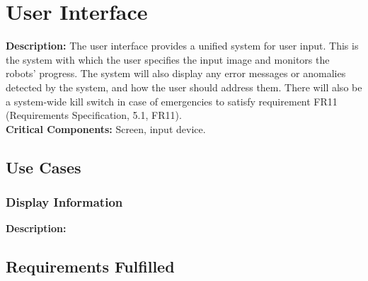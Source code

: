 
\section{User Interface}
\label{sec:user_interface}
\textbf{Description:} The user interface provides a unified system for user input. This is the system with which the user specifies the input image and monitors the robots' progress. The system will also display any error messages or anomalies detected by the system, and how the user should address them. There will also be a system-wide kill switch in case of emergencies to satisfy requirement FR11 (Requirements Specification, 5.1, FR11). \\
\textbf{Critical Components:} Screen, input device. \\

\subsection{Use Cases}
\subsubsection{Display Information}
\textbf{Description:} 

\subsection{Requirements Fulfilled}